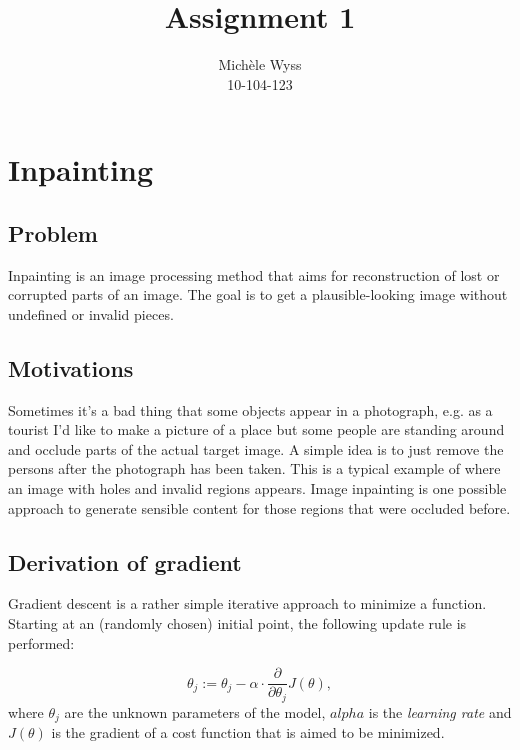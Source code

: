\documentclass{paper}
\title{Assignment 1}
\author{Mich\`{e}le Wyss\\10-104-123}
\begin{document}
\maketitle


%

\section*{Inpainting}
\subsection*{Problem}
Inpainting is an image processing method that aims for reconstruction of lost or corrupted parts of an image. The goal is to get a plausible-looking image without undefined or invalid pieces.

\subsection*{Motivations}
Sometimes it's a bad thing that some objects appear in a photograph, e.g. as a tourist I'd like to make a picture of a place but some people are standing around and occlude parts of the actual target image. A simple idea is to just remove the persons after the photograph has been taken. This is a typical example of where an image with holes and invalid regions appears. Image inpainting is one possible approach to generate sensible content for those regions that were occluded before.

\subsection*{Derivation of gradient}
Gradient descent is a rather simple iterative approach to minimize a function. Starting at an (randomly chosen)  initial point, the following update rule is performed:

\begin{equation}
\theta_j := \theta_j - \alpha \cdot \frac{\partial}{\partial \theta_j} J(\theta),
\label{eq:update-rule}
\end{equation}
where $\theta_j$ are the unknown parameters of the model, $alpha$ is the \emph{learning rate} and $J(\theta)$ is the gradient of a cost function that is aimed to be minimized.
\end{document}
